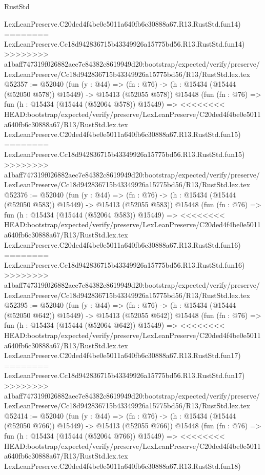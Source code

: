 \begin{lexlean}{RustStd}
\begin{coremodule}
{\begin{coremodule}
{{{{{{{{{{{{{{{{{{{{{{{{{{{{{{{{{{{{{{{{{{{{{{{{{{{{{{{{{{{{    LexLeanPreserve.C20ded4f4be0e5011a640fb6c30888a67.R13.RustStd.fun14)
========
    LexLeanPreserve.Cc18d942836715b43349926a15775bd56.R13.RustStd.fun14)
>>>>>>>> a1baff747319f026882aec7e84382c8619949d20:bootstrap/expected/verify/preserve/LexLeanPreserve/Cc18d942836715b43349926a15775bd56/R13/RustStd.lex.tex
@52357 := @52040
    (fun (y : @44) =>
    (fn : @76) -> (h : @15434 (@15444 (@52050 @578)) @15449) -> @15413 (@52055 @578))
    @15448
    (fun (fn : @76) =>
    fun (h : @15434 (@15444 (@52064 @578)) @15449) =>
<<<<<<<< HEAD:bootstrap/expected/verify/preserve/LexLeanPreserve/C20ded4f4be0e5011a640fb6c30888a67/R13/RustStd.lex.tex
    LexLeanPreserve.C20ded4f4be0e5011a640fb6c30888a67.R13.RustStd.fun15)
========
    LexLeanPreserve.Cc18d942836715b43349926a15775bd56.R13.RustStd.fun15)
>>>>>>>> a1baff747319f026882aec7e84382c8619949d20:bootstrap/expected/verify/preserve/LexLeanPreserve/Cc18d942836715b43349926a15775bd56/R13/RustStd.lex.tex
@52376 := @52040
    (fun (y : @44) =>
    (fn : @76) -> (h : @15434 (@15444 (@52050 @583)) @15449) -> @15413 (@52055 @583))
    @15448
    (fun (fn : @76) =>
    fun (h : @15434 (@15444 (@52064 @583)) @15449) =>
<<<<<<<< HEAD:bootstrap/expected/verify/preserve/LexLeanPreserve/C20ded4f4be0e5011a640fb6c30888a67/R13/RustStd.lex.tex
    LexLeanPreserve.C20ded4f4be0e5011a640fb6c30888a67.R13.RustStd.fun16)
========
    LexLeanPreserve.Cc18d942836715b43349926a15775bd56.R13.RustStd.fun16)
>>>>>>>> a1baff747319f026882aec7e84382c8619949d20:bootstrap/expected/verify/preserve/LexLeanPreserve/Cc18d942836715b43349926a15775bd56/R13/RustStd.lex.tex
@52395 := @52040
    (fun (y : @44) =>
    (fn : @76) -> (h : @15434 (@15444 (@52050 @642)) @15449) -> @15413 (@52055 @642))
    @15448
    (fun (fn : @76) =>
    fun (h : @15434 (@15444 (@52064 @642)) @15449) =>
<<<<<<<< HEAD:bootstrap/expected/verify/preserve/LexLeanPreserve/C20ded4f4be0e5011a640fb6c30888a67/R13/RustStd.lex.tex
    LexLeanPreserve.C20ded4f4be0e5011a640fb6c30888a67.R13.RustStd.fun17)
========
    LexLeanPreserve.Cc18d942836715b43349926a15775bd56.R13.RustStd.fun17)
>>>>>>>> a1baff747319f026882aec7e84382c8619949d20:bootstrap/expected/verify/preserve/LexLeanPreserve/Cc18d942836715b43349926a15775bd56/R13/RustStd.lex.tex
@52414 := @52040
    (fun (y : @44) =>
    (fn : @76) -> (h : @15434 (@15444 (@52050 @766)) @15449) -> @15413 (@52055 @766))
    @15448
    (fun (fn : @76) =>
    fun (h : @15434 (@15444 (@52064 @766)) @15449) =>
<<<<<<<< HEAD:bootstrap/expected/verify/preserve/LexLeanPreserve/C20ded4f4be0e5011a640fb6c30888a67/R13/RustStd.lex.tex
    LexLeanPreserve.C20ded4f4be0e5011a640fb6c30888a67.R13.RustStd.fun18)
}}}}}}}}}}}}}}}}}}}}}}}}}}}}}}}}}}}}}}}}}}}}}}}}}}}}}}}}}}}}
\end{coremodule}}
\end{coremodule}
\end{lexlean}
